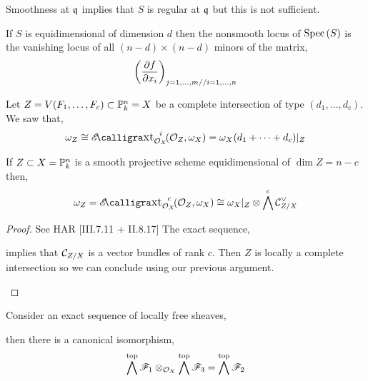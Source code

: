 \documentclass[12pt]{article}
\begin{document}
\begin{rmk}
Smoothness at $\q$ implies that $S$ is regular at $\q$ but this is not sufficient.
\end{rmk}

\begin{rmk}
If $S$ is equidimensional of dimension $d$ then the nonsmooth locus of $\Spec{S}$ is the vanishing locus of all $(n-d) \times (n-d)$ minors of the matrix,
\[ \left( \pderiv{f}{x_i} \right)_{\substack{j = 1, \dots, m // i = 1, \dots , n}} \]
\end{rmk}

\begin{example}
Let $Z = V(F_1, \dots, F_c) \subset \P^n_k = X$ be a complete intersection of type $(d_1, \dots, d_c)$. We saw that,
\[ \omega_Z \cong \shExt{i}{\struct{X}}{\struct{Z}}{\omega_X} = \omega_X(d_1 + \cdots + d_c) |_Z \]
\end{example}

\begin{theorem}
If $Z \subset X = \P^n_k$ is a smooth projective scheme equidimensional of $\dim{Z} = n - c$ then,
\[ \omega_Z = \shExt{c}{\struct{X}}{\struct{Z}}{\omega_X} \cong \omega_X |_Z \otimes \bigwedge^c \C^\vee_{Z/X} \]
\end{theorem}

\begin{proof}
See HAR [III.7.11 + II.8.17]
The exact sequence,
\begin{center}
implies that $\C_{Z/X}$ is a vector bundles of rank $c$. Then $Z$ is locally a complete intersection so we can conclude using our previous argument.
\end{center}
\end{proof}

\begin{lemma}
Consider an exact sequence of locally free sheaves,
\begin{center}
\end{center}
then there is a canonical isomorphism,
\[ \bigwedge^{\text{top}} \F_1 \otimes_{\struct{X}} \bigwedge^{\text{top}} \F_3 = \bigwedge^{\text{top}} \F_2 \]
\end{lemma}
\end{document}
